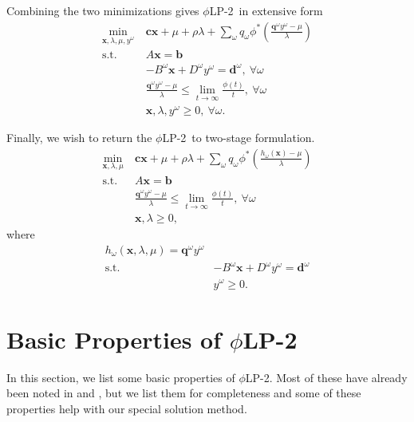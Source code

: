 \documentclass[11pt]{article}
\newcommand{\x}{\mathbf{x}}
\renewcommand{\c}{\mathbf{c}}
\newcommand{\q}{\mathbf{q}}
\renewcommand{\b}{\mathbf{b}}
\renewcommand{\d}{\mathbf{d}}
\newcommand{\st}{\mbox{s.t.}}
\newcommand{\plp}{$\phi$LP-2}
\begin{document}
Combining the two minimizations gives \plp\ in extensive form
\begin{align}
	\min_{\x,\lambda,\mu,y^\omega} \ & \c\x + \mu + \rho \lambda + \sum_\omega q_\omega \phi^*\left(\frac{\q^\omega y^\omega - \mu}{\lambda}\right) \nonumber \\
	\st \ & A\x = \b \nonumber \\
	& -B^\omega \x + D^\omega y^\omega = \d^\omega,\ \forall \omega \label{eq:plp_det_equiv} \\
	& \frac{\q^\omega y^\omega - \mu}{\lambda} \leq \lim_{t \rightarrow \infty} \frac{\phi(t)}{t}, \ \forall \omega \nonumber \\
	& \x,\lambda,y^\omega \geq 0, \ \forall \omega. \nonumber
\end{align}

Finally, we wish to return the \plp\ to two-stage formulation.
\begin{align}
	\min_{\x,\lambda,\mu} \ & \c\x + \mu + \rho \lambda + \sum_\omega q_\omega \phi^*\left(\frac{h_\omega(\x) - \mu}{\lambda}\right) \nonumber \\
	\st \ & A\x = \b \label{eq:plp_two_stage} \\
	& \frac{\q^\omega y^\omega - \mu}{\lambda} \leq \lim_{t \rightarrow \infty} \frac{\phi(t)}{t}, \ \forall \omega \label{eq:plp_feas_constraint}\\
	& \x,\lambda \geq 0, \nonumber
\end{align}
where
\begin{align}
	h_\omega(\x,\lambda,\mu) = \q^\omega y^\omega \label{eq:plp_second_stage} \\
	\st \ & -B^\omega \x + D^\omega y^\omega = \d^\omega \nonumber \\
	& y^\omega \geq 0. \nonumber
\end{align}

\section{Basic Properties of \plp}
\label{sec:properties}

In this section, we list some basic properties of \plp.
Most of these have already been noted in \cite{wang2010likelihood} and \cite{bental2011robust}, but we list them for completeness and some of these properties help with our special solution method.
\end{document}
